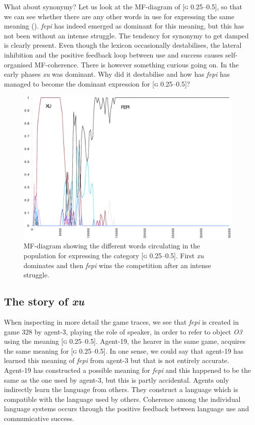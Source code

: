 What about synonymy? Let us look at the 
MF-diagram of [\textsc{g} 0.25–0.5], so that we can
see whether there are any other words in use for expressing
the same meaning ().
\textit{fepi} has indeed emerged as dominant for this meaning, but 
this has not been without an intense struggle.
The tendency for synonymy to get damped is clearly present. 
Even though the lexicon occasionally destabilises, 
the lateral inhibition and the positive feedback loop between use 
and success causes self-organised MF-coherence. 
There is however something curious going on. 
In the early phases \textit{xu} was dominant. Why did it 
destabilise and how has \textit{fepi} has managed to become the
dominant expression for [\textsc{g} 0.25–0.5]? 

\begin{figure}[htbp]
  \centerline{\includegraphics[width=.80\textwidth]{chap7/figs/MF-G-025-050.pdf}}
\caption{\label{g0d2505.f}MF-diagram showing the
different words circulating in the population for expressing
the category [\textsc{g} 0.25–0.5]. First \textit{xu} dominates and 
then \textit{fepi} wins the competition after an intense struggle.}
\end{figure}

\subsection{The story of \textit{xu}}

When inspecting in more detail the game traces,
we see that \textit{fepi} is created in game 328 by agent-3, playing the
role of speaker, in order to refer to object \emph{O3} using 
the meaning [\textsc{g} 0.25–0.5]. Agent-19, the hearer in the same 
game, acquires the same meaning for [\textsc{g} 0.25–0.5]. In one sense,
we could say that agent-19 has learned this meaning of \textit{fepi} from
agent-3 but that is not entirely accurate. Agent-19 
has constructed a possible meaning for \textit{fepi} and this happened
to be the same as the one used by agent-3,
but this is partly accidental. 
Agents only indirectly learn the language from others. They construct
a language which is compatible with the language used by others. 
Coherence among the individual
language systems occurs through the positive feedback between
language use and communicative success.

